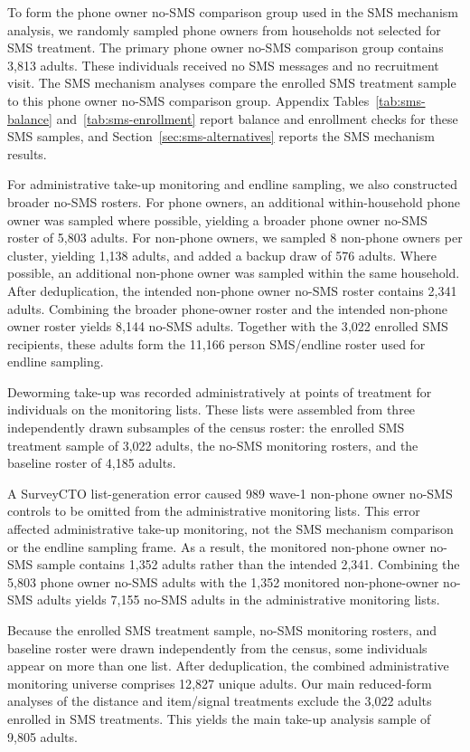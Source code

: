 \documentclass[ECM\space ReStud.tex]{subfiles}
\begin{document}
To form the phone owner no-SMS comparison group used in the SMS mechanism analysis, we randomly sampled phone owners from households not selected for SMS treatment. The primary phone owner no-SMS comparison group contains 3{,}813 adults. These individuals received no SMS messages and no recruitment visit. The SMS mechanism analyses compare the enrolled SMS treatment sample to this phone owner no-SMS comparison group. Appendix Tables~\ref{tab:sms-balance} and~\ref{tab:sms-enrollment} report balance and enrollment checks for these SMS samples, and Section~\ref{sec:sms-alternatives} reports the SMS mechanism results.

For administrative take-up monitoring and endline sampling, we also constructed broader no-SMS rosters. For phone owners, an additional within-household phone owner was sampled where possible, yielding a broader phone owner no-SMS roster of 5{,}803 adults. For non-phone owners, we sampled 8 non-phone owners per cluster, yielding 1{,}138 adults, and added a backup draw of 576 adults. Where possible, an additional non-phone owner was sampled within the same household. After deduplication, the intended non-phone owner no-SMS roster contains 2{,}341 adults. Combining the broader phone-owner roster and the intended non-phone owner roster yields 8{,}144 no-SMS adults. Together with the 3{,}022 enrolled SMS recipients, these adults form the 11{,}166 person SMS/endline roster used for endline sampling.

Deworming take-up was recorded administratively at points of treatment for individuals on the monitoring lists. These lists were assembled from three independently drawn subsamples of the census roster: the enrolled SMS treatment sample of 3{,}022 adults, the no-SMS monitoring rosters, and the baseline roster of 4{,}185 adults.

A SurveyCTO list-generation error caused 989 wave-1 non-phone owner no-SMS controls to be omitted from the administrative monitoring lists. This error affected administrative take-up monitoring, not the SMS mechanism comparison or the endline sampling frame. As a result, the monitored non-phone owner no-SMS sample contains 1{,}352 adults rather than the intended 2{,}341. Combining the 5{,}803 phone owner no-SMS adults with the 1{,}352 monitored non-phone-owner no-SMS adults yields 7{,}155 no-SMS adults in the administrative monitoring lists.

Because the enrolled SMS treatment sample, no-SMS monitoring rosters, and baseline roster were drawn independently from the census, some individuals appear on more than one list. After deduplication, the combined administrative monitoring universe comprises 12{,}827 unique adults. Our main reduced-form analyses of the distance and item/signal treatments exclude the 3{,}022 adults enrolled in SMS treatments. This yields the main take-up analysis sample of 9{,}805 adults.
\end{document}
